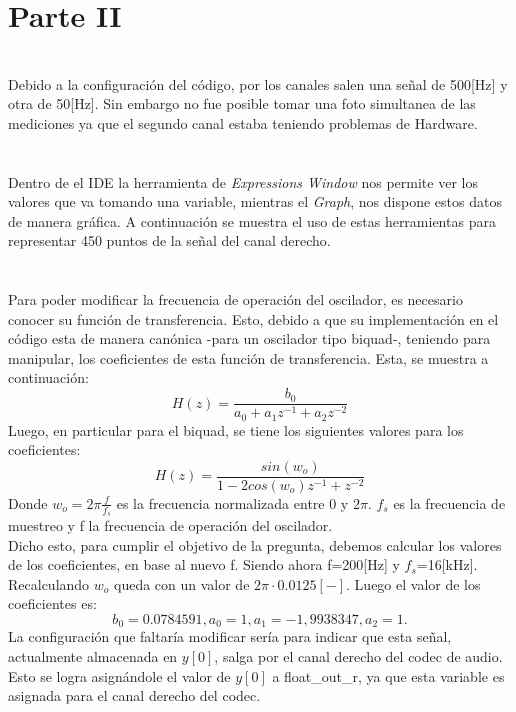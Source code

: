 \documentclass[11pt, letterpaper, titlepage]{article}
\begin{document}
\section*{Parte II}
\section{}%
Debido a la configuración del código, por los canales salen una señal de 500[Hz] y otra de 50[Hz]. Sin embargo no fue posible tomar una foto simultanea de las mediciones ya que el segundo canal estaba teniendo problemas de Hardware.

\section{}%
Dentro de el IDE la herramienta de \emph{Expressions Window} nos permite ver los valores que va tomando una variable, mientras el \emph{Graph}, nos dispone estos datos de manera gráfica. A continuación se muestra el uso de estas herramientas para representar 450 puntos de la señal del canal derecho.
\section{}%
Para poder modificar la frecuencia de operación del oscilador, es necesario conocer su función de transferencia. Esto, debido a que su implementación en el código esta de manera canónica -para un oscilador tipo biquad-, teniendo para manipular, los coeficientes de esta función de transferencia. Esta, se muestra a continuación:
$$H(z)=\frac{b_0}{a_0+a_1z^{-1}+a_2z^{-2}}$$
Luego, en particular para el biquad, se tiene los siguientes valores para los coeficientes:
$$H(z)=\frac{sin(w_o)}{1-2cos(w_o)z^{-1}+z^{-2}}$$
Donde $w_o=2\pi\frac{f}{f_s}$ es la frecuencia normalizada entre 0 y $2\pi$. $f_s$ es la frecuencia de muestreo y f la frecuencia de operación del oscilador.\\

Dicho esto, para cumplir el objetivo de la pregunta, debemos calcular los valores de los coeficientes, en base al nuevo f. Siendo ahora f=200[Hz] y $f_s$=16[kHz]. Recalculando $w_o$ queda con un valor de $2\pi\cdot 0.0125[-]$. Luego el valor de los coeficientes es:
$$b_0=0.0784591,a_0=1,a_1=-1,9938347,a_2=1.$$
La configuración que faltaría modificar sería para indicar que esta señal, actualmente almacenada en $y[0]$, salga por el canal derecho del codec de audio. Esto se logra asignándole el valor de $y[0]$ a float\_out\_r, ya que esta variable es asignada para el canal derecho del codec.
\end{document}
